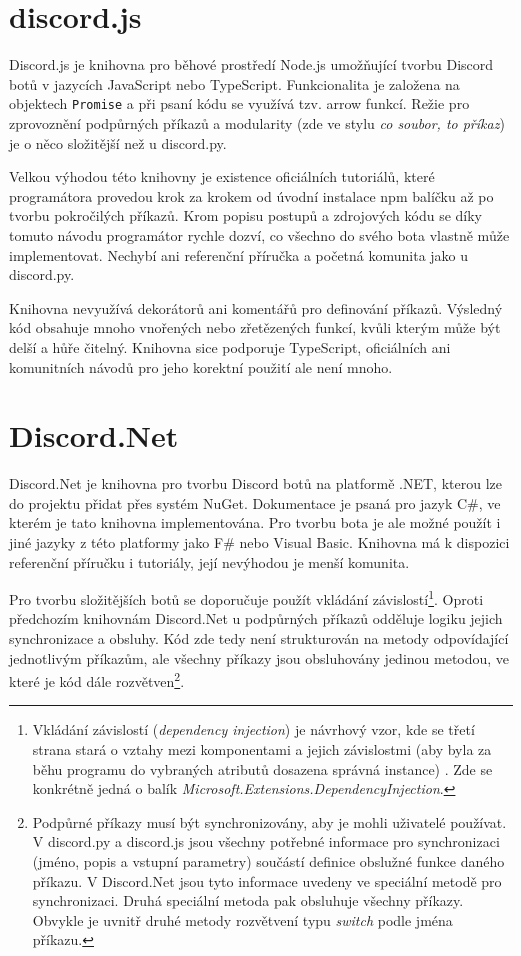 \documentclass[FM]{tulthesis}
\begin{document}
	\section{discord.js}
	
	Discord.js je knihovna pro běhové prostředí Node.js umožňující tvorbu Discord botů v jazycích JavaScript nebo TypeScript. Funkcionalita je založena na objektech \verb*|Promise| a při psaní kódu se využívá tzv. arrow funkcí. Režie pro zprovoznění podpůrných příkazů a modularity (zde ve stylu \textit{co soubor, to příkaz}) je o něco složitější než u discord.py.
	
	Velkou výhodou této knihovny je existence oficiálních tutoriálů, které programátora provedou krok za krokem od úvodní instalace npm balíčku až po tvorbu pokročilých příkazů. Krom popisu postupů a zdrojových kódu se díky tomuto návodu programátor rychle dozví, co všechno do svého bota vlastně může implementovat. Nechybí ani referenční příručka a početná komunita jako u discord.py.
	
	Knihovna nevyužívá dekorátorů ani komentářů pro definování příkazů. Výsledný kód obsahuje mnoho vnořených nebo zřetězených funkcí, kvůli kterým může být delší a hůře čitelný. Knihovna sice podporuje TypeScript, oficiálních ani komunitních návodů pro jeho korektní použití ale není mnoho.
	
	\section{Discord.Net}
	
	Discord.Net je knihovna pro tvorbu Discord botů na platformě .NET, kterou lze do projektu přidat přes systém NuGet. Dokumentace je psaná pro jazyk C\#, ve kterém je tato knihovna implementována. Pro tvorbu bota je ale možné použít i jiné jazyky z této platformy jako F\# nebo Visual Basic. Knihovna má k dispozici referenční příručku i tutoriály, její nevýhodou je menší komunita.
	
	 Pro tvorbu složitějších botů se doporučuje použít vkládání závislostí\footnote{Vkládání závislostí (\textit{dependency injection}) je návrhový vzor, kde se třetí strana stará o vztahy mezi komponentami a jejich závislostmi (aby byla za běhu programu do vybraných atributů dosazena správná instance) \cite{lit_distributedSystems}. Zde se konkrétně jedná o balík \textit{Microsoft.Extensions.DependencyInjection}.}. Oproti předchozím knihovnám Discord.Net u podpůrných příkazů odděluje logiku jejich synchronizace a obsluhy. Kód zde tedy není strukturován na metody odpovídající jednotlivým příkazům, ale všechny příkazy jsou obsluhovány jedinou metodou, ve které je kód dále rozvětven\footnote{Podpůrné příkazy musí být synchronizovány, aby je mohli uživatelé používat. V discord.py a discord.js jsou všechny potřebné informace pro synchronizaci (jméno, popis a vstupní parametry) součástí definice obslužné funkce daného příkazu. V Discord.Net jsou tyto informace uvedeny ve speciální metodě pro synchronizaci. Druhá speciální metoda pak obsluhuje všechny příkazy. Obvykle je uvnitř druhé metody rozvětvení typu \textit{switch} podle jména příkazu.}.
	
\end{document}
